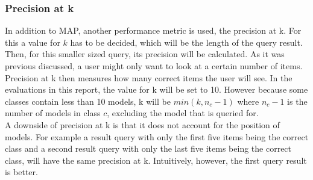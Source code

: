 \documentclass{bigdata}
\begin{document}
\subsubsection{Precision at k}
In addition to MAP, another performance metric is used, the precision at k. For this a value for $k$ has to be decided, which will be the length of the query result. Then, for this smaller sized query, its precision will be calculated. As it was previous discussed, a user might only want to look at a certain number of items. Precision at k then measures how many correct items the user will see. In the evaluations in this report, the value for k will be set to 10. However because some classes contain less than 10 models, k will be $min(k,n_c-1)$ where $n_c - 1$ is the number of models in class $c$, excluding the model that is queried for.\\ 
A downside of precision at k is that it does not account for the position of models. For example a result query with only the first five items being the correct class and a second result query with only  the last five items being the correct class, will have the same precision at k. Intuitively, however, the first query result is better. 
\newpage
\end{document}
